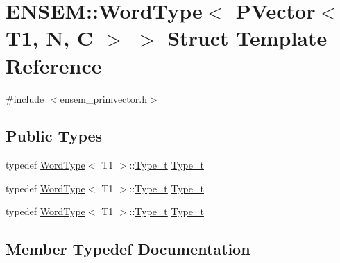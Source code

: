 \hypertarget{structENSEM_1_1WordType_3_01PVector_3_01T1_00_01N_00_01C_01_4_01_4}{}\section{E\+N\+S\+EM\+:\+:Word\+Type$<$ P\+Vector$<$ T1, N, C $>$ $>$ Struct Template Reference}
\label{structENSEM_1_1WordType_3_01PVector_3_01T1_00_01N_00_01C_01_4_01_4}


{\ttfamily \#include $<$ensem\+\_\+primvector.\+h$>$}

\subsection*{Public Types}
\begin{DoxyCompactItemize}
\item 
typedef \mbox{\hyperlink{structENSEM_1_1WordType}{Word\+Type}}$<$ T1 $>$\+::\mbox{\hyperlink{structENSEM_1_1WordType_3_01PVector_3_01T1_00_01N_00_01C_01_4_01_4_aa9f3aa443de1a825586cd47f6d842fe8}{Type\+\_\+t}} \mbox{\hyperlink{structENSEM_1_1WordType_3_01PVector_3_01T1_00_01N_00_01C_01_4_01_4_aa9f3aa443de1a825586cd47f6d842fe8}{Type\+\_\+t}}
\item 
typedef \mbox{\hyperlink{structENSEM_1_1WordType}{Word\+Type}}$<$ T1 $>$\+::\mbox{\hyperlink{structENSEM_1_1WordType_3_01PVector_3_01T1_00_01N_00_01C_01_4_01_4_aa9f3aa443de1a825586cd47f6d842fe8}{Type\+\_\+t}} \mbox{\hyperlink{structENSEM_1_1WordType_3_01PVector_3_01T1_00_01N_00_01C_01_4_01_4_aa9f3aa443de1a825586cd47f6d842fe8}{Type\+\_\+t}}
\item 
typedef \mbox{\hyperlink{structENSEM_1_1WordType}{Word\+Type}}$<$ T1 $>$\+::\mbox{\hyperlink{structENSEM_1_1WordType_3_01PVector_3_01T1_00_01N_00_01C_01_4_01_4_aa9f3aa443de1a825586cd47f6d842fe8}{Type\+\_\+t}} \mbox{\hyperlink{structENSEM_1_1WordType_3_01PVector_3_01T1_00_01N_00_01C_01_4_01_4_aa9f3aa443de1a825586cd47f6d842fe8}{Type\+\_\+t}}
\end{DoxyCompactItemize}


\subsection{Member Typedef Documentation}
\mbox{\label{structENSEM_1_1WordType_3_01PVector_3_01T1_00_01N_00_01C_01_4_01_4_aa9f3aa443de1a825586cd47f6d842fe8}} 
